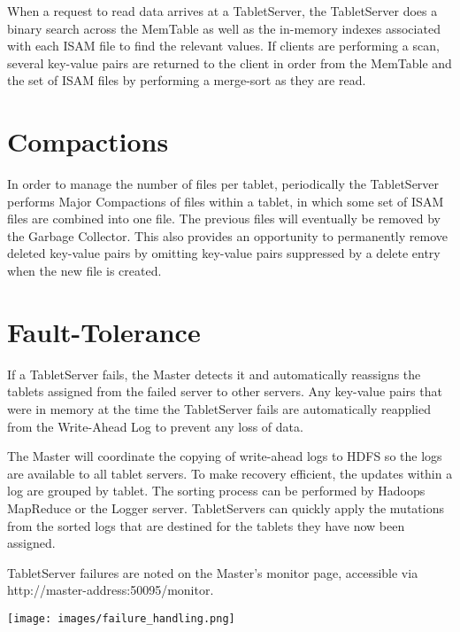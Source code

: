 When a request to read data arrives at a TabletServer, the TabletServer does a
binary search across the MemTable as well as the in-memory indexes associated
with each ISAM file to find the relevant values. If clients are performing a
scan, several key-value pairs are returned to the client in order from the
MemTable and the set of ISAM files by performing a merge-sort as they are read.

\section{Compactions}

In order to manage the number of files per tablet, periodically the TabletServer
performs Major Compactions of files within a tablet, in which some set of ISAM
files are combined into one file. The previous files will eventually be removed
by the Garbage Collector. This also provides an opportunity to permanently
remove deleted key-value pairs by omitting key-value pairs suppressed by a
delete entry when the new file is created.

\section{Fault-Tolerance}

If a TabletServer fails, the Master detects it and automatically reassigns the tablets
assigned from the failed server to other servers. Any key-value pairs that were in
memory at the time the TabletServer fails are automatically reapplied from the Write-Ahead
Log to prevent any loss of data.

The Master will coordinate the copying of write-ahead logs to HDFS so the logs
are available to all tablet servers. To make recovery efficient, the updates
within a log are grouped by tablet.  The sorting process can be performed by
Hadoops MapReduce or the Logger server. TabletServers can quickly apply the
mutations from the sorted logs that are destined for the tablets they have now
been assigned.

TabletServer failures are noted on the Master's monitor page, accessible via\\
\mbox{http://master-address:50095/monitor}.

\begin{center}
\texttt{[image: images/failure\_handling.png]}
\end{center}

